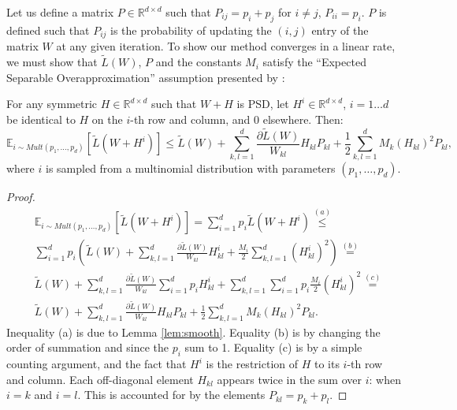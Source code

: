 \documentclass[twoside,11pt]{article}
\newcommand\mat[1]{{#1}}
\newcommand{\W}{\mat{W}}
\newcommand{\Hh}{\mat{H}}
\newcommand{\Pp}{\mat{P}}
\newcommand{\R}{\mathbb{R}}
\newcommand{\tL}{\tilde{L}(\W)}
\newcommand{\grdkl}{\frac{\partial \tL}{\W_{kl}}}
\begin{document}
Let us define a matrix $\Pp \in \R^{d \times d}$ such that $\Pp_{ij} = p_i + p_j$ for $i \ne j$, $\Pp_{ii} = p_i$. $\Pp$ is defined such that $\Pp_{ij}$ is the probability of updating the $(i,j)$ entry of the matrix $\W$ at any given iteration. To show our method converges in a linear rate, we must show that $\tL$, $\Pp$ and the constants $M_i$ satisfy the ``Expected Separable Overapproximation'' assumption presented by \citet{richtarik2013optimal}:

\begin{lemma}\label{lem:ESO}
For any symmetric $\Hh \in \R^{d \times d}$ such that $\W + \Hh$ is PSD, let $\Hh^i \in \R^{d \times d}$, $i=1 \ldots d$ be identical to $\Hh$ on the $i$-th row and column, and $0$ elsewhere. Then:
\begin{equation}
\mathbb{E}_{i \sim Mult(p_1, \ldots, p_d)} \left[ \tilde{L}(\W + \Hh^i) \right] \leq 
\tL + \sum_{k,l=1}^d  \grdkl \Hh_{kl} \Pp_{kl} + \frac{1}{2} \sum_{k,l=1}^d   M_k (\Hh_{kl})^2 \Pp_{kl},
\end{equation}
where $i$ is sampled from a multinomial distribution with parameters $(p_1, \ldots , p_d)$.
\end{lemma}

\begin{proof}%
\begin{align*}
&\mathbb{E}_{i \sim Mult(p_1, \ldots, p_d)} \left[ \tilde{L}(\W + \Hh^i) \right] =\sum_{i=1}^d p_i \tilde{L}(\W + \Hh^i) \stackrel{(a)}{\leq} \\
& \sum_{i=1}^d p_i \left(\tL + \sum_{k,l=1}^d \grdkl \Hh_{kl}^i + \frac{M_i}{2} \sum_{k,l=1}^d  (\Hh_{kl}^i)^2 \right) \stackrel{(b)}{=} \\
& \tL + \sum_{k,l=1}^d \grdkl \sum_{i=1}^d  p_i \Hh_{kl}^i + \sum_{k,l=1}^d  \sum_{i=1}^d  p_i \frac{M_i}{2} (\Hh_{kl}^i)^2  \stackrel{(c)}{=} \\
& \tL + \sum_{k,l=1}^d \grdkl \Hh_{kl} \Pp_{kl} + \frac{1}{2} \sum_{k,l=1}^d M_k (\Hh_{kl})^2 \Pp_{kl}.
\end{align*}
Inequality (a) is due to Lemma \ref{lem:smooth}. Equality (b) is by changing the order of summation and since the $p_i$ sum to 1. Equality (c) is by a simple counting argument, and the fact that $\Hh^i$ is the restriction of $\Hh$ to its $i$-th row and column. Each off-diagonal element $\Hh_{kl}$ appears twice in the sum over $i$: when $i=k$ and $i=l$. This is accounted for by the elements $\Pp_{kl} = p_k + p_l$.
\end{proof}
\end{document}
